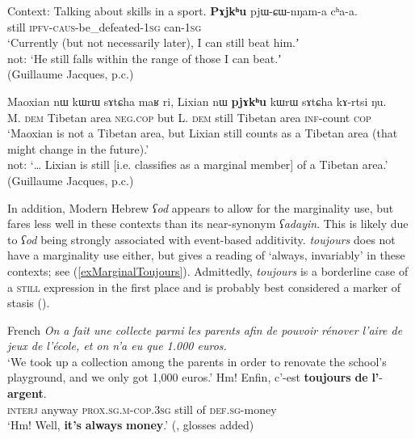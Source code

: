 \begin{exe}
	\ex   \label{exMarginalJaphug}
	\begin{xlist}
		\exi{}
		\ex Context: Talking about skills in a sport.
		\exi{}\gll \textbf{Pɤjkʰu} pjɯ-ɕɯ-nŋam-a cʰa-a.\\
		still \textsc{ipfv}-\textsc{caus}-be\_defeated-1\textsc{sg} can-1\textsc{sg}\\
		\glt \lq Currently (but not necessarily later), I can still beat him.ʼ\\
		not: \lq He still falls within the range of those I can beat.ʼ
		\\(Guillaume Jacques, p.c.)
	
		\ex{}
		\gll Maoxian nɯ kɯrɯ sɤtɕha maʁ ri, Lixian nɯ \textbf{pjɤkʰu} kɯrɯ sɤtɕha kɤ-rtsi ŋu.\\
		M. \textsc{dem} Tibetan area \textsc{neg}.\textsc{cop} but L. \textsc{dem} still Tibetan area \textsc{inf}-count \textsc{cop}\\
		\glt \lq Maoxian is not a Tibetan area, but Lixian still counts as a Tibetan area (that might change in the future).'\\
		not: \lq … Lixian is still [i.e. classifies as a marginal member] of a Tibetan area.' (Guillaume Jacques, p.c.)
	\end{xlist}
\end{exe}

In addition, Modern Hebrew \textit{ʕod} appears to allow for the marginality use, but fares less well in these contexts than its near-synonym \textit{ʕadayin}. This is likely due to \textit{ʕod} being strongly associated with event-based additivity.  \textit{toujours} does not have a marginality use either, but gives a reading of \lq always, invariably' in these contexts; see (\ref{exMarginalToujours}). Admittedly, \textit{toujours} is a borderline case of a \textsc{still} expression in the first place and is probably best considered a marker of stasis ().

\begin{exe}
\sloppy
	\ex French \label{exMarginalToujours}
	 \textit{On a fait une collecte parmi les parents afin de pouvoir rénover l’aire de jeux de l’école, et on n’a eu que 1.000 euros.}\\
	\lq We took up a collection among the parents in order to renovate the school’s playground, and we only got 1,000 euros.'
	\gll Hm! Enfin, c’-est \textbf{toujours} \textbf{de} \textbf{l’}-\textbf{argent}.\\
	\textsc{interj} anyway  \textsc{prox}.\textsc{sg}.\textsc{m}-\textsc{cop}.3\textsc{sg} still of \textsc{def}.\textsc{sg}-money\\
	\glt \lq Hm! Well, \textbf{it's} \textbf{always} \textbf{money}.' (\cite[172]{MosegaardHansen2008}, glosses added)
\end{exe}

